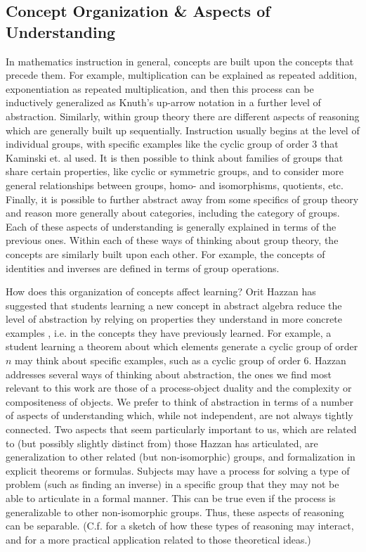 \documentclass[man,10pt]{apa6}
\begin{document}
\subsection{Concept Organization \& Aspects of Understanding} %
In mathematics instruction in general, concepts are built upon the concepts that precede them. For example, multiplication can be explained as repeated addition, exponentiation as repeated multiplication, and then this process can be inductively generalized as Knuth's up-arrow notation in a further level of abstraction. Similarly, within group theory there are different aspects of reasoning which are generally built up sequentially. Instruction usually begins at the level of individual groups, with specific examples like the cyclic group of order 3 that Kaminski et. al used. It is then possible to think about families of groups that share certain properties, like cyclic or symmetric groups, and to consider more general relationships between groups, homo- and isomorphisms, quotients, etc. Finally, it is possible to further abstract away from some specifics of group theory and reason more generally about categories, including the category of groups. Each of these aspects of understanding is generally explained in terms of the previous ones. Within each of these ways of thinking about group theory, the concepts are similarly built upon each other. For example, the concepts of identities and inverses are defined in terms of group operations.\par
How does this organization of concepts affect learning? Orit Hazzan has suggested that students learning a new concept in abstract algebra reduce the level of abstraction by relying on properties they understand in more concrete examples \cite{Hazzan1999}, i.e. in the concepts they have previously learned. For example, a student learning a theorem about which elements generate a cyclic group of order $n$ may think about specific examples, such as a cyclic group of order 6. Hazzan addresses several ways of thinking about abstraction, the ones we find most relevant to this work are those of a process-object duality and the complexity or compositeness of objects. We prefer to think of abstraction in terms of a number of aspects of understanding which, while not independent, are not always tightly connected. Two aspects that seem particularly important to us, which are related to (but possibly slightly distinct from) those Hazzan has articulated, are generalization to other related (but non-isomorphic) groups, and formalization in explicit theorems or formulas. Subjects may have a process for solving a type of problem (such as finding an inverse) in a specific group that they may not be able to articulate in a formal manner. This can be true even if the process is generalizable to other non-isomorphic groups. Thus, these aspects of reasoning can be separable. (C.f. \cite{Dubinsky1991} for a sketch of how these types of reasoning may interact, and \cite{Leron1995} for a more practical application related to those theoretical ideas.) \par
\end{document}
